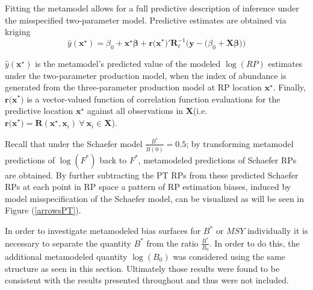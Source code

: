 %
Fitting the metamodel allows for a full predictive description of inference
under the misspecified two-parameter model.
Predictive estimates are obtained via kriging \cite{cressie_statistics_2015} %
\begin{equation} \label{gpYHat} %
        \hat y(\textbf{x}^\star) = \beta_0 + \textbf{x}^\star\bm{\beta} + \textbf{r(x}^\star\textbf{)}'\bm{R}^{-1}_{\bm{\ell}}\Big(\textbf{y}-\big(\beta_0+\bm{X}\bm{\beta}\big)\Big)
\end{equation}

%
$\hat y(\textbf{x}^\star)$ is the metamodel's predicted value of the modeled $\log(RP)$ estimates %
under the two-parameter production model, when the index of abundance %
is generated from the three-parameter production model at RP location $\textbf{x}^\star$.
Finally, $\textbf{r(x}^\star\textbf{)}$ is a vector-valued function of correlation function 
evaluations for the predictive location $\textbf{x}^\star$ against all observations 
in $\bm{X}$(i.e. $\textbf{r(x}^\star\textbf{)}=\bm{R}(\textbf{x}^\star, \bm{x}_i)~\forall~\bm{x}_i\in\bm{X}$).


{\color{blue}
Recall that under the Schaefer model $\frac{B^*}{\bar B(0)}=0.5$; by transforming 
metamodel predictions of $\log(F^*)$ back to $F^*$, metamodeled predictions of Schaefer 
RPs are obtained.
By further subtracting the PT RPs from these predicted Schaefer RPs 
at each point in RP space a pattern of RP estimation biases, induced by model 
misspecification of the Schaefer model, can be visualized as will be seen in Figure (\ref{arrowsPT}).

In order to investigate metamodeled bias surfaces for $B^*$ or $MSY$ individually 
it is necessary to separate the quantity $B^*$ from the ratio $\frac{B^*}{B_0}$. 
In order to do this, the additional metamodeled quantity $\log(B_0)$ was considered 
using the same structure as seen in this section. Ultimately those results were 
found to be consistent with the results presented throughout and thus were not 
included. %
}

